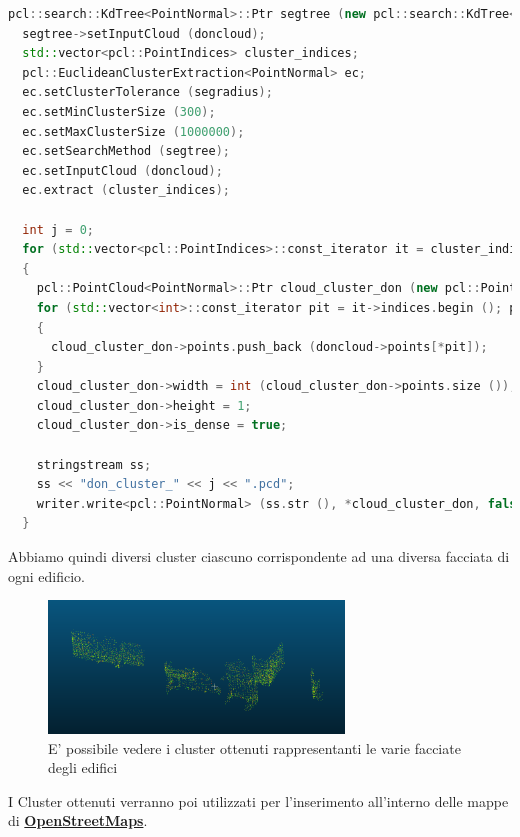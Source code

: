 \begin{lstlisting}[caption={Clustering usando PCL},captionpos=b,language=cpp]
  pcl::search::KdTree<PointNormal>::Ptr segtree (new pcl::search::KdTree<PointNormal>);
  segtree->setInputCloud (doncloud);
  std::vector<pcl::PointIndices> cluster_indices;
  pcl::EuclideanClusterExtraction<PointNormal> ec;
  ec.setClusterTolerance (segradius);
  ec.setMinClusterSize (300);
  ec.setMaxClusterSize (1000000);
  ec.setSearchMethod (segtree);
  ec.setInputCloud (doncloud);
  ec.extract (cluster_indices);

  int j = 0;
  for (std::vector<pcl::PointIndices>::const_iterator it = cluster_indices.begin (); it != cluster_indices.end (); ++it, j++)
  {
    pcl::PointCloud<PointNormal>::Ptr cloud_cluster_don (new pcl::PointCloud<PointNormal>);
    for (std::vector<int>::const_iterator pit = it->indices.begin (); pit != it->indices.end (); ++pit)
    {
      cloud_cluster_don->points.push_back (doncloud->points[*pit]);
    }
    cloud_cluster_don->width = int (cloud_cluster_don->points.size ());
    cloud_cluster_don->height = 1;
    cloud_cluster_don->is_dense = true;

    stringstream ss;
    ss << "don_cluster_" << j << ".pcd";
    writer.write<pcl::PointNormal> (ss.str (), *cloud_cluster_don, false);
  }
\end{lstlisting}{}

Abbiamo quindi diversi cluster ciascuno corrispondente ad una diversa facciata di ogni edificio.

\begin{figure}[H]
    \centering
    \includegraphics[width=0.7\textwidth]{Immagini/clusters.png}
    \caption{E' possibile vedere i cluster ottenuti rappresentanti le varie facciate degli edifici}
    \label{fig:clusters}
\end{figure}

I Cluster ottenuti verranno poi utilizzati per l'inserimento all'interno delle mappe di \hyperref[sez:OSM]{\textbf{OpenStreetMaps}}.